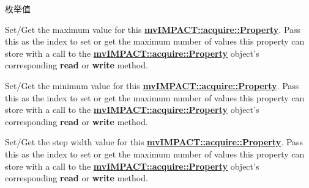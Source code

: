 \begin{Desc}
\item[枚举值]\par
\begin{description}
\item[{\em 
\hypertarget{group___common_interface_ggab31a9721792e36b8c256a769961df4f9ae1741c28905c58c1873e458f994b3d32}{pl\+Max\+Value}\label{group___common_interface_ggab31a9721792e36b8c256a769961df4f9ae1741c28905c58c1873e458f994b3d32}
}]Set/\+Get the maximum value for this {\bfseries \hyperlink{classmv_i_m_p_a_c_t_1_1acquire_1_1_property}{mv\+I\+M\+P\+A\+C\+T\+::acquire\+::\+Property}}. Pass this as the index to set or get the maximum number of values this property can store with a call to the {\bfseries \hyperlink{classmv_i_m_p_a_c_t_1_1acquire_1_1_property}{mv\+I\+M\+P\+A\+C\+T\+::acquire\+::\+Property}} object's corresponding {\bfseries read} or {\bfseries write} method. \item[{\em 
\hypertarget{group___common_interface_ggab31a9721792e36b8c256a769961df4f9a1f7c627c279e3393bf6bae37b883caf2}{pl\+Min\+Value}\label{group___common_interface_ggab31a9721792e36b8c256a769961df4f9a1f7c627c279e3393bf6bae37b883caf2}
}]Set/\+Get the minimum value for this {\bfseries \hyperlink{classmv_i_m_p_a_c_t_1_1acquire_1_1_property}{mv\+I\+M\+P\+A\+C\+T\+::acquire\+::\+Property}}. Pass this as the index to set or get the maximum number of values this property can store with a call to the {\bfseries \hyperlink{classmv_i_m_p_a_c_t_1_1acquire_1_1_property}{mv\+I\+M\+P\+A\+C\+T\+::acquire\+::\+Property}} object's corresponding {\bfseries read} or {\bfseries write} method. \item[{\em 
\hypertarget{group___common_interface_ggab31a9721792e36b8c256a769961df4f9a0b4df6e0f7f4c251d3d7119e3b62beaf}{pl\+Step\+Width}\label{group___common_interface_ggab31a9721792e36b8c256a769961df4f9a0b4df6e0f7f4c251d3d7119e3b62beaf}
}]Set/\+Get the step width value for this {\bfseries \hyperlink{classmv_i_m_p_a_c_t_1_1acquire_1_1_property}{mv\+I\+M\+P\+A\+C\+T\+::acquire\+::\+Property}}. Pass this as the index to set or get the maximum number of values this property can store with a call to the {\bfseries \hyperlink{classmv_i_m_p_a_c_t_1_1acquire_1_1_property}{mv\+I\+M\+P\+A\+C\+T\+::acquire\+::\+Property}} object's corresponding {\bfseries read} or {\bfseries write} method. \end{description}
\end{Desc}
